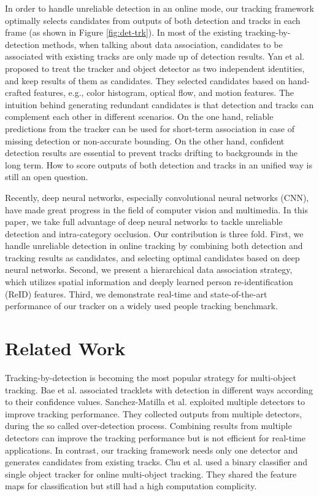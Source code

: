 \documentclass{article}
\begin{document}
In order to handle unreliable detection in an online mode,
our tracking framework optimally selects candidates 
from outputs of both detection and tracks in each frame (as shown in Figure \ref{fig:det-trk}).
In most of the existing tracking-by-detection methods, when talking about data association,
candidates to be associated with existing tracks are only made up of detection results. 
Yan et al. \cite{yan2012track} proposed to treat the tracker and object detector as two independent identities,
and keep results of them as candidates.
They selected candidates based on hand-crafted features, 
e.g., color histogram, optical flow, and motion features.
The intuition behind generating redundant candidates
is that detection and tracks can complement each other in different scenarios.
On the one hand,
reliable predictions from the tracker can be used for short-term association in case of  
missing detection or non-accurate bounding.
On the other hand,
confident detection results are essential to prevent tracks drifting to backgrounds in the long term.
How to score outputs of both detection and tracks 
in an unified way is still an open question.

Recently, deep neural networks, especially convolutional neural networks (CNN), 
have made great progress in the field of computer vision and multimedia.
In this paper, we take full advantage of deep neural networks 
to tackle unreliable detection and intra-category occlusion.
Our contribution is three fold.
First, we handle unreliable detection in online tracking by 
combining both detection and tracking results as candidates,
and selecting optimal candidates based on deep neural networks.
Second, we present a hierarchical data association strategy, which utilizes spatial information and deeply learned person re-identification (ReID) features.
Third, we demonstrate real-time and state-of-the-art performance of our tracker on a widely used people tracking benchmark.




\section{Related Work}
Tracking-by-detection is becoming the most popular strategy for multi-object tracking.
Bae et al. \cite{bae2017confidence} associated tracklets with detection in different ways
according to their confidence values.
Sanchez-Matilla et al. \cite{sanchez2016online} exploited multiple detectors 
to improve tracking performance.
They collected outputs from multiple detectors, during the so called over-detection process.
Combining results from multiple detectors can improve the tracking performance 
but is not efficient for real-time applications.
In contrast, our tracking framework needs only one detector and
generates candidates from existing tracks.
Chu et al. \cite{chu2017online} used a binary classifier and single object tracker for online multi-object tracking.
They shared the feature maps for classification but still had a high computation complicity.
\end{document}
